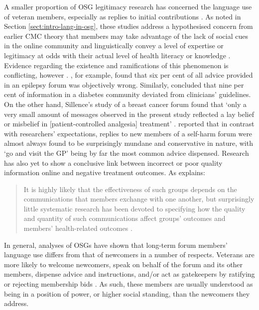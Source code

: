 \documentclass{article}
\renewcommand{\cite}{\parencite}
\begin{document}
A smaller proportion of OSG legitimacy research has concerned the language use of veteran members, especially as replies to initial contributions \cite{paulus_`please_2015}. As noted in Section \ref{sect:intro-lang-in-osg}, these studies address a hypothesised concern from earlier CMC theory that members may take advantage of the lack of social cues in the online community and linguistically convey a level of expertise or legitimacy at odds with their actual level of health literacy or knowledge \cite{varga2014grieving}. Evidence regarding the existence and ramifications of this phenomenon is conflicting, however \cite{sillence_giving_2013}. \textcite{hoch_information_1999}, for example, found that six per cent of all advice provided in an epilepsy forum was objectively wrong. Similarly, \textcite{hoffman-goetz_clinical_2009} concluded that nine per cent of information in a diabetes community deviated from clinicians' guidelines. On the other hand, Sillence's study of a breast cancer forum found that `only a very small amount of messages observed in the present study reflected a lay belief or misbelief in [patient-controlled analgesia] treatment' \parencite*[p.~8]{sillence_communicating_2012}. \textcite{smithson_problem_2011} reported that in contrast with researchers' expectations, replies to new members of a self-harm forum were almost always found to be surprisingly mundane and conservative in nature, with `go and visit the GP' being by far the most common advice dispensed. Research has also yet to show a conclusive link between incorrect or poor quality information online and negative treatment outcomes. As \citeauthor{wang_stay_2012} explains:

\begin{quote}\small\singlespacing
It is highly likely that the effectiveness of such groups depends on the communications that members exchange with one another, but surprisingly little systematic research has been devoted to specifying how the quality and quantity of such communications affect groups' outcomes and members' health-related outcomes \parencite*[p.~1]{wang_stay_2012}.
\end{quote}

In general, analyses of OSGs have shown that long-term forum members' language use differs from that of newcomers in a number of respects. Veterans are more likely to welcome newcomers, speak on behalf of the forum and its other members, dispense advice and instructions, and\slash or act as gatekeepers by ratifying or rejecting membership bids \cite{paulus_`please_2015,pederson_supporting_2010,weber_missed_2011}. As such, these members are usually understood as being in a position of power, or higher social standing, than the newcomers they address.
\end{document}
